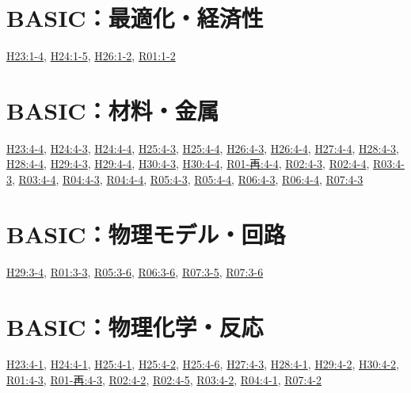 \section{BASIC：最適化・経済性}
\hyperref[q:h23-reg-basic-1-4]{H23:1-4}, \hyperref[q:h24-reg-basic-1-5]{H24:1-5}, \hyperref[q:h26-reg-basic-1-2]{H26:1-2}, \hyperref[q:r01-reg-basic-1-2]{R01:1-2}
\section{BASIC：材料・金属}
\hyperref[q:h23-reg-basic-4-4]{H23:4-4}, \hyperref[q:h24-reg-basic-4-3]{H24:4-3}, \hyperref[q:h24-reg-basic-4-4]{H24:4-4}, \hyperref[q:h25-reg-basic-4-3]{H25:4-3}, \hyperref[q:h25-reg-basic-4-4]{H25:4-4}, \hyperref[q:h26-reg-basic-4-3]{H26:4-3}, \hyperref[q:h26-reg-basic-4-4]{H26:4-4}, \hyperref[q:h27-reg-basic-4-4]{H27:4-4}, \hyperref[q:h28-reg-basic-4-3]{H28:4-3}, \hyperref[q:h28-reg-basic-4-4]{H28:4-4}, \hyperref[q:h29-reg-basic-4-3]{H29:4-3}, \hyperref[q:h29-reg-basic-4-4]{H29:4-4}, \hyperref[q:h30-reg-basic-4-3]{H30:4-3}, \hyperref[q:h30-reg-basic-4-4]{H30:4-4}, \hyperref[q:r01-ret-basic-4-4]{R01-再:4-4}, \hyperref[q:r02-reg-basic-4-3]{R02:4-3}, \hyperref[q:r02-reg-basic-4-4]{R02:4-4}, \hyperref[q:r03-reg-basic-4-3]{R03:4-3}, \hyperref[q:r03-reg-basic-4-4]{R03:4-4}, \hyperref[q:r04-reg-basic-4-3]{R04:4-3}, \hyperref[q:r04-reg-basic-4-4]{R04:4-4}, \hyperref[q:r05-reg-basic-4-3]{R05:4-3}, \hyperref[q:r05-reg-basic-4-4]{R05:4-4}, \hyperref[q:r06-reg-basic-4-3]{R06:4-3}, \hyperref[q:r06-reg-basic-4-4]{R06:4-4}, \hyperref[q:r07-reg-basic-4-3]{R07:4-3}
\section{BASIC：物理モデル・回路}
\hyperref[q:h29-reg-basic-3-4]{H29:3-4}, \hyperref[q:r01-reg-basic-3-3]{R01:3-3}, \hyperref[q:r05-reg-basic-3-6]{R05:3-6}, \hyperref[q:r06-reg-basic-3-6]{R06:3-6}, \hyperref[q:r07-reg-basic-3-5]{R07:3-5}, \hyperref[q:r07-reg-basic-3-6]{R07:3-6}
\section{BASIC：物理化学・反応}
\hyperref[q:h23-reg-basic-4-1]{H23:4-1}, \hyperref[q:h24-reg-basic-4-1]{H24:4-1}, \hyperref[q:h25-reg-basic-4-1]{H25:4-1}, \hyperref[q:h25-reg-basic-4-2]{H25:4-2}, \hyperref[q:h25-reg-basic-4-6]{H25:4-6}, \hyperref[q:h27-reg-basic-4-3]{H27:4-3}, \hyperref[q:h28-reg-basic-4-1]{H28:4-1}, \hyperref[q:h29-reg-basic-4-2]{H29:4-2}, \hyperref[q:h30-reg-basic-4-2]{H30:4-2}, \hyperref[q:r01-reg-basic-4-3]{R01:4-3}, \hyperref[q:r01-ret-basic-4-3]{R01-再:4-3}, \hyperref[q:r02-reg-basic-4-2]{R02:4-2}, \hyperref[q:r02-reg-basic-4-5]{R02:4-5}, \hyperref[q:r03-reg-basic-4-2]{R03:4-2}, \hyperref[q:r04-reg-basic-4-1]{R04:4-1}, \hyperref[q:r07-reg-basic-4-2]{R07:4-2}
